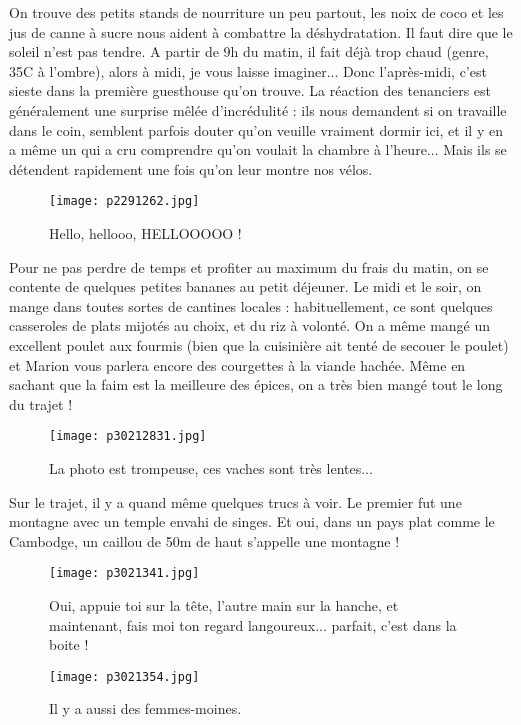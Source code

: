 \documentclass{book}
\begin{document}
On trouve des petits stands de nourriture un peu partout, les noix de coco et les jus de canne à sucre nous aident à combattre la déshydratation. Il faut dire que le soleil n'est pas tendre. A partir de 9h du matin, il fait déjà trop chaud (genre, 35\textdegree C à l'ombre), alors à midi, je vous laisse imaginer... Donc l'après-midi, c'est sieste dans la première guesthouse qu'on trouve. La réaction des tenanciers  est généralement une surprise mêlée d'incrédulité : ils nous demandent si on travaille dans le coin, semblent parfois douter qu'on veuille vraiment dormir ici, et il y en a même un qui a cru comprendre qu'on voulait la chambre à l'heure... Mais ils se détendent rapidement une fois qu'on leur montre nos vélos.


\begin{figure}[h]
\centering
\texttt{[image: p2291262.jpg]}
\caption*{Hello, hellooo, HELLOOOOO !}
\end{figure}

Pour ne pas perdre de temps et profiter au maximum du frais du matin, on se contente de quelques petites bananes au petit déjeuner. Le midi et le soir, on mange dans toutes sortes de cantines locales : habituellement, ce sont quelques casseroles de plats mijotés au choix, et du riz à volonté. On a même mangé un excellent poulet aux fourmis (bien que la cuisinière ait tenté de secouer le poulet) et Marion vous parlera encore des courgettes à la viande hachée. Même en sachant que la faim est la meilleure des épices, on a très bien mangé tout le long du trajet !


\begin{figure}[h]
\centering
\texttt{[image: p30212831.jpg]}
\caption*{La photo est trompeuse, ces vaches sont très lentes...}
\end{figure}

Sur le trajet, il y a quand même quelques trucs à voir. Le premier fut une montagne avec un temple envahi de singes. Et oui, dans un pays plat comme le Cambodge, un caillou de 50m de haut s'appelle une montagne !


\begin{figure}[h]
\centering
\texttt{[image: p3021341.jpg]}
\caption*{Oui, appuie toi sur la tête, l'autre main sur la hanche, et maintenant, fais moi ton regard langoureux... parfait, c'est dans la boite !}
\end{figure}


\begin{figure}[h]
\centering
\texttt{[image: p3021354.jpg]}
\caption*{Il y a aussi des femmes-moines.}
\end{figure}
\end{document}
